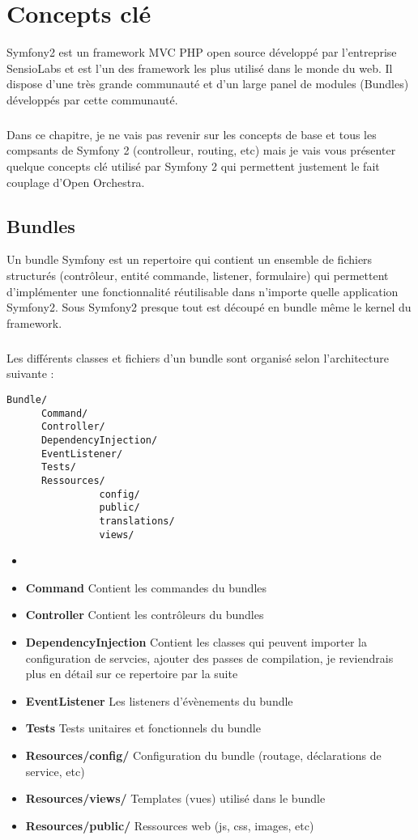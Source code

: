 \chapter{Concepts clé}
Symfony2 est un framework MVC PHP open source développé par l'entreprise SensioLabs et est l'un des framework les plus utilisé dans le monde du web. Il dispose d'une très grande communauté et d'un large panel de modules (\og{}Bundles\fg{}) développés par cette communauté.
\paragraph{}
Dans ce chapitre, je ne vais pas revenir sur les concepts de base et tous les compsants de Symfony 2 (controlleur, routing, etc) mais je vais vous présenter quelque concepts clé utilisé par Symfony 2 qui permettent justement le fait couplage d'Open Orchestra.
\section{Bundles}
Un bundle Symfony est un repertoire qui contient un ensemble de fichiers structurés (contrôleur, entité commande, listener, formulaire) qui permettent d'implémenter une fonctionnalité réutilisable dans n'importe quelle application Symfony2. Sous Symfony2 presque tout est découpé en bundle même le kernel du framework.
\paragraph{}
Les différents classes et fichiers d'un bundle sont organisé selon l'architecture suivante : 

\begin{verbatim}
Bundle/
      Command/  
      Controller/
      DependencyInjection/
      EventListener/
      Tests/
      Ressources/
                config/
                public/
                translations/
                views/
\end{verbatim}
\begin{itemize}
\item[]
\item \textbf{Command} Contient les commandes du bundles
\item \textbf{Controller} Contient les contrôleurs du bundles
\item \textbf{DependencyInjection} Contient les classes qui peuvent importer la configuration de servcies, ajouter des passes de compilation, je reviendrais plus en détail sur ce repertoire par la suite
\item \textbf{EventListener} Les listeners d'évènements du bundle
\item \textbf{Tests} Tests unitaires et fonctionnels du bundle
\item \textbf{Resources/config/} Configuration du bundle (routage, déclarations de service, etc)
\item \textbf{Resources/views/} Templates (vues) utilisé dans le bundle
\item \textbf{Resources/public/} Ressources web (js, css, images, etc)
\end{itemize}
